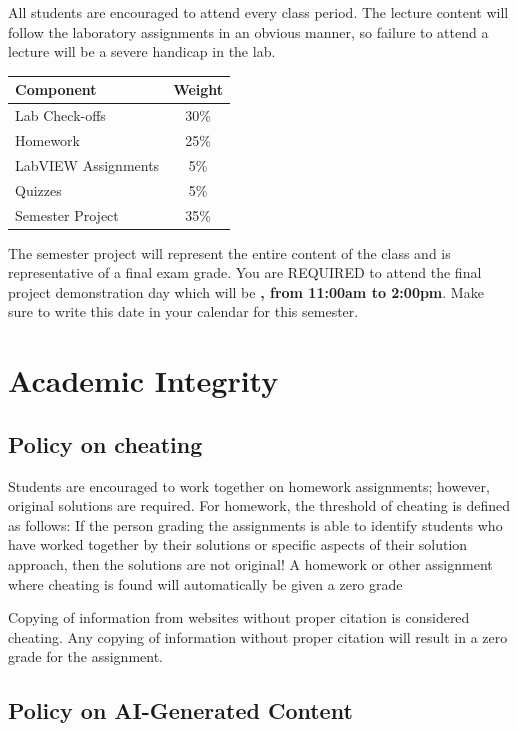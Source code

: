 \documentclass[11pt]{article}
\begin{document}
All students are encouraged to attend every class period. The lecture content will follow the laboratory assignments in an obvious manner, so failure to attend a lecture will be a severe handicap in the lab.
%
\begin{center}
    \begin{tabular}{l c}
        \textbf{Component} & \textbf{Weight} \\
        \hline
        Lab Check-offs & 30\% \\
        Homework & 25\% \\
        LabVIEW Assignments & 5\% \\
        Quizzes & 5\% \\
        Semester Project & 35\%
    \end{tabular}
\end{center}
%
The semester project will represent the entire content of the class and is representative of a final exam grade. You are REQUIRED to attend the final project demonstration day which will be \textbf{\Final, from 11:00am to 2:00pm}. Make sure to write this date in your calendar for this semester.

\section*{Academic Integrity}

\subsection*{Policy on cheating}

Students are encouraged to work together on homework assignments; however, original solutions are required. For homework, the threshold of cheating is defined as follows: If the person grading the assignments is able to identify students who have worked together by their solutions or specific aspects of their solution approach, then the solutions are not original! A homework or other assignment where cheating is found will automatically be given a zero grade
\par
Copying of information from websites without proper citation is considered cheating. Any copying of information without proper citation will result in a zero grade for the assignment.

\subsection*{Policy on AI-Generated Content}
\end{document}
